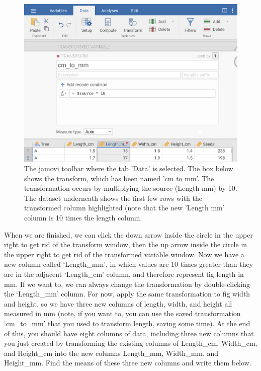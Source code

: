 \documentclass[
]{scrbook}
\begin{document}
\begin{figure}
\includegraphics[width=1\linewidth]{img/jamovi_transform_cm_to_mm} \caption{The jamovi toolbar where the tab 'Data' is selected. The box below shows the transform, which has been named 'cm to mm'. The transformation occurs by multiplying the source (Length mm) by 10. The dataset underneath shows the first few rows with the transformed column highlighted (note that the new 'Length mm' column is 10 times the length column.}\label{fig:unnamed-chunk-32}
\end{figure}

When we are finished, we can click the down arrow inside the circle in the upper right to get rid of the transform window, then the up arrow inside the circle in the upper right to get rid of the transformed variable window.
Now we have a new column called `Length\_mm', in which values are 10 times greater than they are in the adjacent `Length\_cm' column, and therefore represent fig length in mm.
If we want to, we can always change the transformation by double-clicking the `Length\_mm' column.
For now, apply the same transformation to fig width and height, so we have three new columns of length, width, and height all measured in mm (note, if you want to, you can use the saved transformation `cm\_to\_mm' that you used to transform length, saving some time).
At the end of this, you should have eight columns of data, including three new columns that you just created by transforming the existing columns of Length\_cm, Width\_cm, and Height\_cm into the new columns Length\_mm, Width\_mm, and Height\_mm.
Find the means of these three new columns and write them below.
\end{document}
